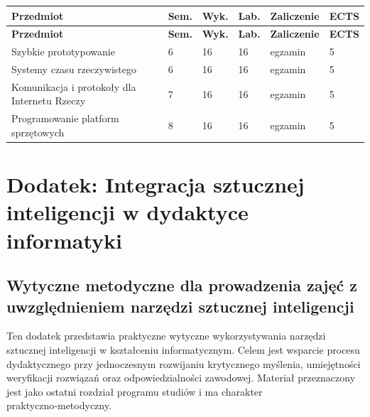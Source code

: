 \documentclass[12pt,a4paper]{article}
\newcommand{\thdrule}{\noalign{\global\setlength{\extrarowheight}{0pt}}}
\newcommand{\thdend}{\noalign{\global\setlength{\extrarowheight}{4pt}}}
\begin{document}
{\scriptsize
\begin{longtable}{m{6.5cm}m{0.7cm}m{1cm}m{1cm}m{1.7cm}m{0.7cm}}
\thdrule\toprule
\rowcolor{pjatkRed}
{\color{white}\footnotesize\textbf{\vphantom{Ag}Przedmiot}} & {\color{white}\footnotesize\textbf{\vphantom{Ag}Sem.}} & {\color{white}\footnotesize\textbf{\vphantom{Ag}Wyk.}} & {\color{white}\footnotesize\textbf{\vphantom{Ag}Lab.}} & {\color{white}\footnotesize\textbf{\vphantom{Ag}Zaliczenie}} & {\color{white}\footnotesize\textbf{\vphantom{Ag}ECTS}} \\
\midrule\thdend
\endfirsthead
\thdrule\toprule
\rowcolor{pjatkRed}
{\color{white}\footnotesize\textbf{\vphantom{Ag}Przedmiot}} & {\color{white}\footnotesize\textbf{\vphantom{Ag}Sem.}} & {\color{white}\footnotesize\textbf{\vphantom{Ag}Wyk.}} & {\color{white}\footnotesize\textbf{\vphantom{Ag}Lab.}} & {\color{white}\footnotesize\textbf{\vphantom{Ag}Zaliczenie}} & {\color{white}\footnotesize\textbf{\vphantom{Ag}ECTS}} \\
\midrule\thdend
\endhead
\rowcolor{tableRowLight} Szybkie prototypowanie & 6 & 16 & 16 & {\scriptsize egzamin} & 5 \\
\rowcolor{tableRowAlt} Systemy czasu rzeczywistego & 6 & 16 & 16 & {\scriptsize egzamin} & 5 \\
\rowcolor{tableRowLight} Komunikacja i protokoły dla Internetu Rzeczy & 7 & 16 & 16 & {\scriptsize egzamin} & 5 \\
\rowcolor{tableRowAlt} Programowanie platform sprzętowych & 8 & 16 & 16 & {\scriptsize egzamin} & 5 \\
\bottomrule
\end{longtable}}




\newpage
\section*{Dodatek: Integracja sztucznej inteligencji w dydaktyce informatyki}

\subsection*{Wytyczne metodyczne dla prowadzenia zajęć z uwzględnieniem narzędzi sztucznej inteligencji}
\vspace{0.3cm}
\noindent Ten dodatek przedstawia praktyczne wytyczne wykorzystywania narzędzi sztucznej inteligencji w kształceniu informatycznym. Celem jest wsparcie procesu dydaktycznego przy jednoczesnym rozwijaniu krytycznego myślenia, umiejętności weryfikacji rozwiązań oraz odpowiedzialności zawodowej. Materiał przeznaczony jest jako ostatni rozdział programu studiów i ma charakter praktyczno‑metodyczny.
\bigskip
\end{document}
